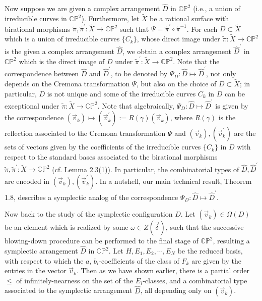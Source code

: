 \documentclass[11pt]{amsart}
\theoremstyle{plain}
\numberwithin{theorem}{section}
\theoremstyle{definition}
\newcommand{\C}{{\mathbb C}}
\renewcommand{\P}{{\mathbb P}}
\begin{document}
Now suppose we are given a complex arrangement $\hat{D}$ in $\C\P^2$ (i.e., a union of irreducible curves in 
$\C\P^2$). Furthermore, let $\tilde{X}$ be a rational surface with birational morphisms 
$\tilde{\pi}, \tilde{\pi}^\prime: \tilde{X}\rightarrow \C\P^2$ such that $\Psi=\tilde{\pi}^\prime\circ \tilde{\pi}^{-1}$.
For each $D\subset \tilde{X}$ which is a union of irreducible curves $\{C_k\}$, whose direct image under
$\tilde{\pi}: \tilde{X}\rightarrow \C\P^2$ is the given a complex arrangement $\hat{D}$, we obtain a complex
arrangement $\hat{D}^\prime$ in $\C\P^2$ which is the direct image of $D$ under 
$\tilde{\pi}^\prime: \tilde{X}\rightarrow \C\P^2$. Note that the correspondence between $\hat{D}$ and $\hat{D}^\prime$, to be denoted by $\Psi_D: \hat{D}\mapsto \hat{D}^\prime$, not only depends on the Cremona transformation $\Psi$, but also on the choice of $D\subset \tilde{X}$; in particular, $D$ is not unique and some of 
the irreducible curves $C_k$ in $D$ can be exceptional under $\tilde{\pi}: \tilde{X}\rightarrow \C\P^2$. Note that
algebraically, $\Psi_D: \hat{D}\mapsto \hat{D}^\prime$ is given by the correspondence $(\vec{v}_k)\mapsto 
(\vec{v}_k^\prime):=R(\gamma)(\vec{v}_k)$, where $R(\gamma)$ is the reflection associated to the Cremona transformation $\Psi$ and $(\vec{v}_k), (\vec{v}_k^\prime)$ are the sets of vectors given by the coefficients of the 
irreducible curves $\{C_k\}$ in $D$ with respect to the standard bases associated to the birational morphisms 
$\tilde{\pi}, \tilde{\pi}^\prime: \tilde{X}\rightarrow \C\P^2$  (cf. Lemma 2.3(1)). In particular, the combinatorial types of $\hat{D},\hat{D}^\prime$ are encoded in $(\vec{v}_k), (\vec{v}_k^\prime)$. In a nutshell, our main technical result, Theorem 1.8, describes a symplectic analog of the correspondence  
$\Psi_D: \hat{D}\mapsto \hat{D}^\prime$. 

\vspace{2mm}

Now back to the study of the symplectic configuration $D$. Let $(\vec{v}_k)\in\Omega(D)$ be an element which is realized by some $\omega\in Z(\vec{\delta})$, such that the successive blowing-down procedure can be performed to the final stage of $\C\P^2$, resulting a symplectic arrangement $\hat{D}$ in $\C\P^2$.
Let $H,E_1,E_2,\cdots,E_N$ be the reduced basis, with respect to which the $a$, $b_i$-coefficients of the class of $F_k$ are given by the entries in the vector $\vec{v}_k$. Then as we have shown earlier, there is a partial order 
$\leq$ of infinitely-nearness on the set of the $E_i$-classes, and a combinatorial type associated to the symplectic arrangement $\hat{D}$, all depending only on $(\vec{v}_k)$. 
\end{document}
